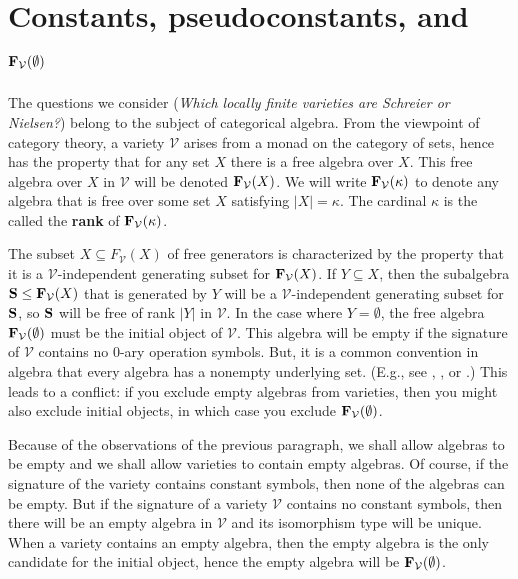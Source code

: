 \documentclass[12pt]{amsart}
\theoremstyle{definition}
\numberwithin{equation}{section}
\newcommand{\m}[1]{{\mathbf{\uppercase{#1}}}}
\begin{document}
\section{Constants, pseudoconstants, and
  $\m f_{\mathcal V}(\emptyset)$} \label{FV(0)}

The questions we consider (\emph{Which locally finite varieties
are Schreier or Nielsen?}) belong to the subject of
categorical algebra.
From the viewpoint of category theory,
a variety $\mathcal V$ arises from a monad on the category of sets,
hence
has the property
that for any set $X$ there is a free algebra over $X$.
This free algebra over $X$ in $\mathcal{V}$
will be denoted $\m f_{\mathcal{V}}(X)$.
We will write $\m f_{\mathcal{V}}(\kappa)$ to denote any
algebra that is free over some set $X$ satisfying $|X|=\kappa$.
The cardinal $\kappa$ is the called the {\bf rank} of
$\m f_{\mathcal{V}}(\kappa)$.

The subset $X\subseteq F_{\mathcal{V}}(X)$ of free
generators is characterized by the property
that it is 
a $\mathcal{V}$-independent generating subset for
$\m f_{\mathcal{V}}(X)$. If $Y\subseteq X$, then
the subalgebra $\m s\leq \m f_{\mathcal{V}}(X)$ that
is generated by $Y$ will be a
$\mathcal{V}$-independent generating subset for
$\m s$, so $\m s$ will be free of rank $|Y|$ in $\mathcal{V}$.
In the case where $Y=\emptyset$,
the free algebra $\m f_{\mathcal V}(\emptyset)$ must be the initial
object of $\mathcal V$. This algebra
will be empty if the signature of $\mathcal{V}$
contains no $0$-ary operation symbols.
But, it is a common convention in algebra
that every algebra has a nonempty underlying set.
(E.g., see 
\cite[Definition~1.1]{bergman},
\cite[Definition~1.3]{burris}, or
\cite[Definition~1.1]{mmt}.)
This leads to a conflict:
if you exclude empty algebras from varieties,
then you might also exclude initial objects,
in which case you exclude $\m f_{\mathcal V}(\emptyset)$.

Because of the observations of the previous paragraph,
we shall allow algebras to be empty
and we shall allow varieties to contain empty algebras.
Of course, if the signature of the variety contains constant
symbols, then none of the algebras can be empty.
But if the signature of a variety $\mathcal V$ contains no constant
symbols, then there will be an empty algebra in $\mathcal V$ and
its isomorphism type will be unique.
When a variety contains an empty algebra,
then the empty algebra is the only candidate for
the initial object, hence the empty algebra will be
$\m f_{\mathcal V}(\emptyset)$.
\end{document}
